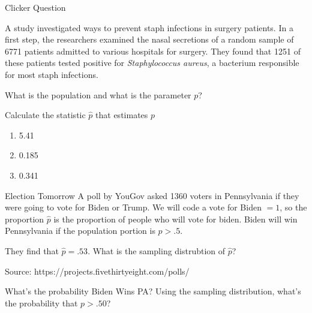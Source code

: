 \documentclass{beamer}
\begin{document}
\begin{frame}{Clicker Question}
	
	A study investigated ways to prevent staph infections in surgery patients. In a first step, the researchers examined the nasal secretions of a random sample of 6771 patients admitted to various hospitals for surgery. They found that 1251 of these patients tested positive for \textit{Staphylococcus aureus}, a bacterium responsible for most staph infections.
	
	What is the population and what is the parameter $p$?
	
	Calculate the statistic $\hat{p}$ that estimates $p$
	\begin{enumerate}[label=(\alph*)]
		\item 5.41
		\item 0.185
		\item 0.341
	\end{enumerate}
	
\end{frame}

\frame

\begin{frame}{Election Tomorrow}
	A poll by YouGov asked 1360 voters in Pennsylvania if they were going to vote for Biden or Trump. We will code a vote for Biden $=1$, so the proportion $\hat{p}$ is the proportion of people who will vote for biden. Biden will win Pennsylvania if the population portion is $p > .5$. 

	They find that $\hat{p} = .53$. What is the sampling distrubtion of $\hat{p}$? 


	{\footnotesize Source: https://projects.fivethirtyeight.com/polls/}

\end{frame}

\frame 

\begin{frame}{What's the probability Biden Wins PA?}
	Using the sampling distribution, what's the probability that $p > .50$?
\end{frame}

\frame
 

\end{document}
